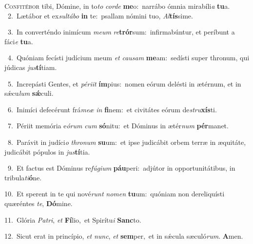 \lettrine{\initial\textcolor{\initialcolor}{C}}{onfitébor} tibi, Dómine, in to\textit{to} \textit{cor}\-\textit{de} \textbf{me}\-o:~\star narrábo ómnia mirabíli\textit{a} \textbf{tu}\-a.\\
{\numbfont\textcolor{\numbcolor}{~2.}}~Lætábor et ex\-\textit{sul}\-\textit{tá}\textit{bo} \textbf{in} te:~\star psallam nómini tuo, \textit{Al}\-\textbf{tís}sime.\par
{\numbfont\textcolor{\numbcolor}{~3.}}~In converténdo inimícum \textit{me}\-\textit{um} \textit{re}\-\textbf{trór}sum:~\star infirmabúntur, et períbunt a fáci\textit{e} \textbf{tu}\-a.\par
{\numbfont\textcolor{\numbcolor}{~4.}}~Quóniam fecísti judícium meum \textit{et} \textit{cau}\-\textit{sam} \textbf{me}\-am:~\star sedísti super thronum, qui júdicas \textit{jus}\-\textbf{tí}tiam.\par
{\numbfont\textcolor{\numbcolor}{~5.}}~Increpásti Gentes, et \textit{pér}\-\textit{i}\textit{it} \textbf{ím}\-pius:~\star nomen eórum delésti in ætérnum, et in sǽcu\textit{lum} \textbf{sǽ}\-culi.\par
{\numbfont\textcolor{\numbcolor}{~6.}}~Inimíci defecérunt frá\-\textit{me}\-\textit{æ} \textit{in} \textbf{fi}\-nem:~\star et civitátes eórum de\-\textit{stru}\-\textbf{xís}ti.\par
{\numbfont\textcolor{\numbcolor}{~7.}}~Périit memória e\-\textit{ó}\-\textit{rum} \textit{cum} \textbf{só}\-nitu:~\star et Dóminus in ætér\textit{num} \textbf{pér}\-manet.\par
{\numbfont\textcolor{\numbcolor}{~8.}}~Parávit in judíci\textit{o} \textit{thro}\-\textit{num} \textbf{su}\-um:~\star et ipse judicábit orbem terræ in æquitáte, judicábit pópulos in \textit{jus}\-\textbf{tí}tia.\par
{\numbfont\textcolor{\numbcolor}{~9.}}~Et factus est Dóminus re\-\textit{fú}\-\textit{gi}\textit{um} \textbf{páu}\-peri:~\star adjútor in opportunitátibus, in tribula\-\textit{ti}\-\textbf{ó}ne.\par
{\numbfont\textcolor{\numbcolor}{10.}}~Et sperent in te qui nové\textit{runt} \textit{no}\-\textit{men} \textbf{tu}\-um:~\star quóniam non dereliquísti quæréntes \textit{te}\-, \textbf{Dó}\-mine.\par
{\numbfont\textcolor{\numbcolor}{11.}}~Glória \textit{Pa}\-\textit{tri}, \textit{et} \textbf{Fí}\-lio,~\star et Spirítu\textit{i} \textbf{Sanc}\-to.\par
{\numbfont\textcolor{\numbcolor}{12.}}~Sicut erat in princípio, \textit{et} \textit{nunc}\-, \textit{et} \textbf{sem}\-per,~\star et in sǽcula sæculó\-\textit{rum}\-. \textbf{A}\-men.\par
